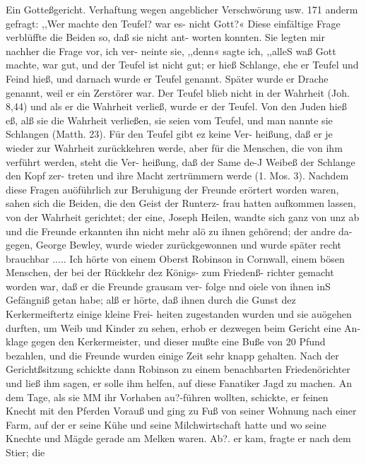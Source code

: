 Ein Gotteßgericht. Verhaftung wegen angeblicher Verschwörung usw. 171
anderm gefragt: ,,Wer machte den Teufel? war es- nicht Gott?«
Diese einfältige Frage verblüffte die Beiden so, daß sie nicht ant-
worten konnten. Sie legten mir nachher die Frage vor, ich ver-
neinte sie, ,,denn« sagte ich, ,,alleS waß Gott machte, war gut,
und der Teufel ist nicht gut; er hieß Schlange, ehe er Teufel und
Feind hieß, und darnach wurde er Teufel genannt. Später
wurde er Drache genannt, weil er ein Zerstörer war. Der Teufel
blieb nicht in der Wahrheit (Joh. 8,44) und als er die Wahrheit
verließ, wurde er der Teufel. Von den Juden hieß eß, alß sie
die Wahrheit verließen, sie seien vom Teufel, und man nannte
sie Schlangen (Matth. 23). Für den Teufel gibt ez keine Ver-
heißung, daß er je wieder zur Wahrheit zurückkehren werde, aber
für die Menschen, die von ihm verführt werden, steht die Ver-
heißung, daß der Same de-J Weibeß der Schlange den Kopf zer-
treten und ihre Macht zertrümmern werde (1. Mos. 3). Nachdem
diese Fragen auöführlich zur Beruhigung der Freunde erörtert
worden waren, sahen sich die Beiden, die den Geist der Runterz-
frau hatten aufkommen lassen, von der Wahrheit gerichtet; der
eine, Joseph Heilen, wandte sich ganz von unz ab und die Freunde
erkannten ihn nicht mehr alö zu ihnen gehörend; der andre da-
gegen, George Bewley, wurde wieder zurückgewonnen und wurde
später recht brauchbar .....
Ich hörte von einem Oberst Robinson in Cornwall, einem
bösen Menschen, der bei der Rückkehr dez Königs- zum Friedenß-
richter gemacht worden war, daß er die Freunde grausam ver-
folge nnd oiele von ihnen inS Gefängniß getan habe; alß er hörte,
daß ihnen durch die Gunst dez Kerkermeiftertz einige kleine Frei-
heiten zugestanden wurden und sie auögehen durften, um Weib
und Kinder zu sehen, erhob er dezwegen beim Gericht eine An-
klage gegen den Kerkermeister, und dieser mußte eine Buße von
20 Pfund bezahlen, und die Freunde wurden einige Zeit sehr knapp
gehalten. Nach der Gerichtßsitzung schickte dann Robinson zu
einem benachbarten Friedenörichter und ließ ihm sagen, er solle
ihm helfen, auf diese Fanatiker Jagd zu machen. An dem Tage,
als sie MM ihr Vorhaben au?-führen wollten, schickte, er feinen
Knecht mit den Pferden Vorauß und ging zu Fuß von seiner
Wohnung nach einer Farm, auf der er seine Kühe und seine
Milchwirtschaft hatte und wo seine Knechte und Mägde gerade
am Melken waren. Ab?. er kam, fragte er nach dem Stier; die


